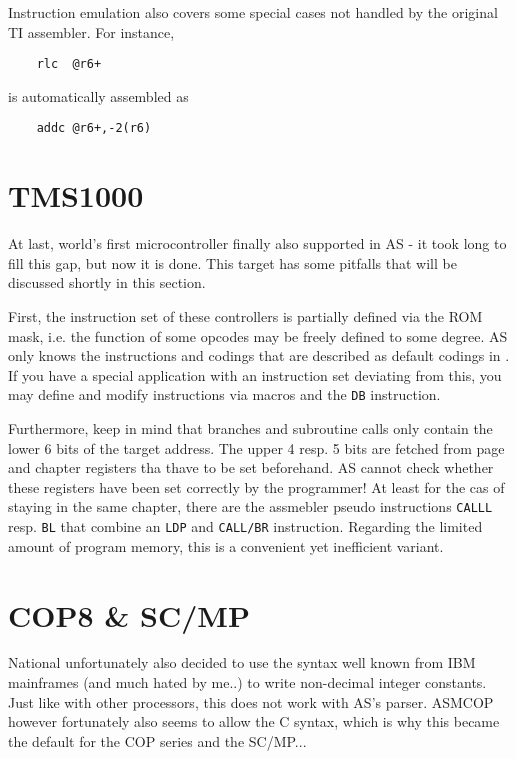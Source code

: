 \documentclass[12pt,twoside]{report}
\newcommand{\tty}[1]{{\tt #1}}
\begin{document}
Instruction emulation also covers some special cases not handled
by the original TI assembler.  For instance,
\begin{verbatim}
    rlc  @r6+
\end{verbatim}
is automatically assembled as
\begin{verbatim}
    addc @r6+,-2(r6)
\end{verbatim}


\section{TMS1000}

At last, world's first microcontroller finally also supported in
AS - it took long to fill this gap, but now it is done.  This
target has some pitfalls that will be discussed shortly in this
section.

First, the instruction set of these controllers is partially
defined via the ROM mask, i.e. the function of some opcodes may
be freely defined to some degree.  AS only knows the instructions
and codings that are described as default codings in
\cite{TMS1000PGMRef}.  If you have a special application with an
instruction set deviating from this, you may define and modify
instructions via macros and the \tty{DB} instruction.

Furthermore, keep in mind that branches and subroutine calls only
contain the lower 6 bits of the target address.  The upper 4
resp. 5 bits are fetched from page and chapter registers tha
thave to be set beforehand.  AS cannot check whether these
registers have been set correctly by the programmer! At least for
the cas of staying in the same chapter, there are the assmebler
pseudo instructions \tty{CALLL} resp. \tty{BL} that combine an
\tty{LDP} and \tty{CALL/BR} instruction.  Regarding the limited
amount of program memory, this is a convenient yet inefficient
variant.


\section{COP8 \& SC/MP}
\label{COP8Spec}

National unfortunately also decided to use the syntax well known from
IBM mainframes (and much hated by me..) to write non-decimal integer
constants.  Just like with other processors, this does not work with
AS's parser.  ASMCOP however fortunately also seems to allow the C
syntax, which is why this became the default for the COP series and
the SC/MP...
\end{document}
